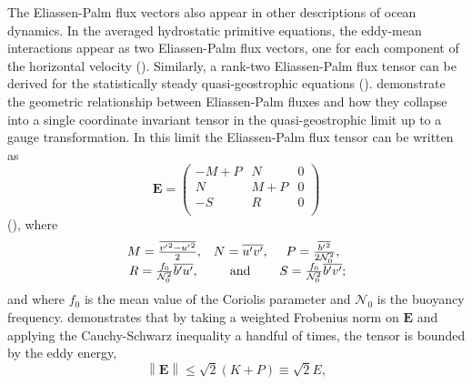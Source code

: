 \documentclass[12pt,a4paper]{report}
\newcommand*\mean[1]{\overline{#1}}
\newcommand*\res[1]{{#1}^{\prime}}
\begin{document}
                
                The Eliassen-Palm flux vectors also appear in other descriptions of ocean dynamics.
                In the averaged hydrostatic primitive equations, the eddy-mean interactions
                appear as two Eliassen-Palm flux vectors, one for each component of the horizontal velocity
                (\cite{young2012exact}). Similarly, a rank-two Eliassen-Palm flux tensor
                can be derived for the statistically steady quasi-geostrophic equations (\cite{cronin1996eddy}). \cite{maddison2013eliassen} demonstrate
                the geometric relationship between Eliassen-Palm fluxes and how they
                collapse into a single coordinate invariant tensor in the
                quasi-geostrophic limit up to a gauge transformation.
                In this limit the Eliassen-Palm flux tensor can be written as
                \begin{equation}
                \boldsymbol{E} 
                =\left(  \begin{array}{ccc}
                -M+P &
                N & 0 \\
                N &  
                M + P & 0\\
                -S  &  
                R & 0\\
                \end{array} \right) 
                \end{equation}
                (\cite{plumb1986three}), where 
                \begin{equation}
                \begin{array}{ccc}
                M = \frac{\mean{{\res{v}}^{2} - {\res{u}}^{2}}}{2}, & 
                N = \mean{\res{u}\res{v} }, &
                P =  \frac{\mean{{\res{b}}^{2}}}{2\mathcal{N}_{0}^{2}},  \\ 
                R =  \frac{f_{0}}{\mathcal{N}_{0}^{2}}\mean{\res{b}\res{u}}, \, & \rm and  &  
                S = \frac{f_{0}}{\mathcal{N}_{0}^{2}}\mean{\res{b}\res{v}} ;
                \end{array} 
                \end{equation}
                 and where $f_{0}$ is the mean value of the Coriolis parameter and $\mathcal{N}_{0}$ is the buoyancy frequency. \cite{marshall2012framework}
                demonstrates that by taking a weighted Frobenius norm on $\boldsymbol{E} $
                and applying the Cauchy-Schwarz inequality a handful of times, the 
                 tensor is bounded by the eddy energy,
                 \begin{equation}
                 {\left\|\boldsymbol{E}\right\|\leq\sqrt{2}\left(K+P\right)\equiv \sqrt{2}E},
                 \end{equation} 
\end{document}
